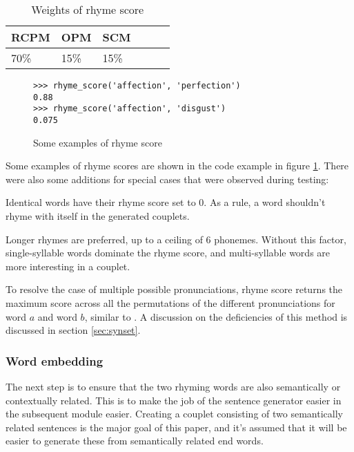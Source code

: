 \documentclass[11pt,a4paper]{article}
\newenvironment{tight_enumerate}{
\begin{enumerate}
\setlength{\itemsep}{0pt}
\setlength{\parskip}{0pt}
}{\end{enumerate}}
\begin{document}
\begin{table}[ht]
\centering
\begin{tabular}{lll c c c}
	\hline\hline
	RCPM & OPM & SCM \\ [0.5ex]
	\hline
	70\% & 15\% & 15\% \\ [0.5ex]
	\hline
\end{tabular}
\caption{Weights of rhyme score}
\label{table:weight_rhyme_score}
\end{table}

\begin{figure}
\begin{Verbatim}[fontsize=\small]
>>> rhyme_score('affection', 'perfection')
0.88
>>> rhyme_score('affection', 'disgust')
0.075
\end{Verbatim}
\caption{Some examples of rhyme score}
\label{fig:rhymescorecode}
\end{figure}

Some examples of rhyme scores are shown in the code example in figure \ref{fig:rhymescorecode}. There were also some additions for special cases that were observed during testing:

\begin{tight_enumerate}
	\vspace{-0.5em}
	\item
		Identical words have their rhyme score set to 0. As a rule, a word shouldn't rhyme with itself in the generated couplets.
	\item
		Longer rhymes are preferred, up to a ceiling of 6 phonemes. Without this factor, single-syllable words dominate the rhyme score, and multi-syllable words are more interesting in a couplet.
	\item
		To resolve the case of multiple possible pronunciations, rhyme score returns the maximum score across all the permutations of the different pronunciations for word $a$ and word $b$, similar to \citet{keswarani}. A discussion on the deficiencies of this method is discussed in section \ref{sec:synset}.
\end{tight_enumerate}

\subsubsection{Word embedding}
\label{sec:fasttext}
The next step is to ensure that the two rhyming words are also semantically or contextually related. This is to make the job of the sentence generator easier in the subsequent module easier. Creating a couplet consisting of two semantically related sentences is the major goal of this paper, and it's assumed that it will be easier to generate these from semantically related end words.
\end{document}
